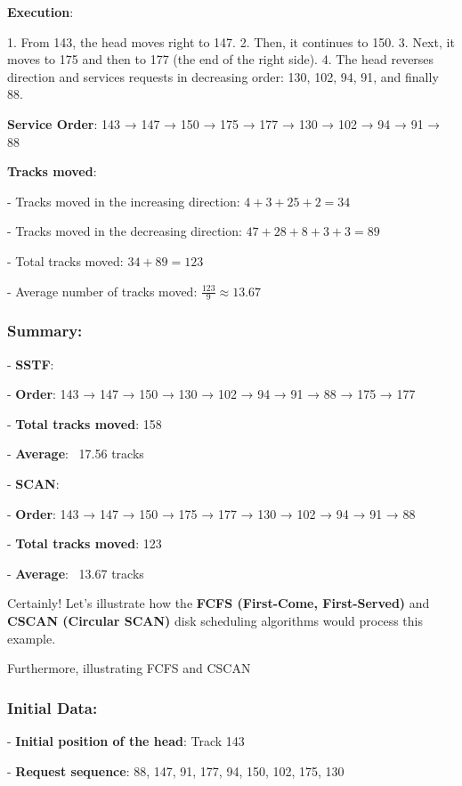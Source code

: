 \documentclass[a4paper]{book}
\begin{document}
\textbf{Execution}:

1. From 143, the head moves right to 147.
2. Then, it continues to 150.
3. Next, it moves to 175 and then to 177 (the end of the right side).
4. The head reverses direction and services requests in decreasing order: 130, 102, 94, 91, and finally 88.

\textbf{Service Order}: 143 → 147 → 150 → 175 → 177 → 130 → 102 → 94 → 91 → 88

\textbf{Tracks moved}:

- Tracks moved in the increasing direction: \(4 + 3 + 25 + 2 = 34\)

- Tracks moved in the decreasing direction: \(47 + 28 + 8 + 3 + 3 = 89\)

- Total tracks moved: \(34 + 89 = 123\)

- Average number of tracks moved: \(\frac{123}{9} \approx 13.67\)


\subsubsection{\textbf{Summary}:}

- \textbf{SSTF}:

  
  - \textbf{Order}: 143 → 147 → 150 → 130 → 102 → 94 → 91 → 88 → 175 → 177

  - \textbf{Total tracks moved}: 158

  - \textbf{Average}: ~17.56 tracks


- \textbf{SCAN}:

  
  - \textbf{Order}: 143 → 147 → 150 → 175 → 177 → 130 → 102 → 94 → 91 → 88

  - \textbf{Total tracks moved}: 123

  - \textbf{Average}: ~13.67 tracks


Certainly! Let's illustrate how the \textbf{FCFS (First-Come, First-Served)} and \textbf{CSCAN (Circular SCAN)} disk scheduling algorithms would process this example.

\begin{greenbox}
Furthermore, illustrating FCFS and CSCAN
\end{greenbox}

\subsubsection{Initial Data:}

- \textbf{Initial position of the head}: Track 143

- \textbf{Request sequence}: 88, 147, 91, 177, 94, 150, 102, 175, 130
\end{document}
